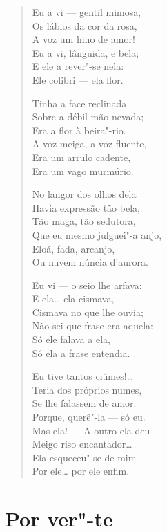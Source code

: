 \begin{verse}
Eu a vi --- gentil mimosa,\\
Os lábios da cor da rosa,\\
A voz um hino de amor!\\
Eu a vi, lânguida, e bela;\\
E ele a rever"-se nela:\\
Ele colibri --- ela flor.

Tinha a face reclinada\\
Sobre a débil mão nevada;\\
Era a flor à beira"-rio.\\
A voz meiga, a voz fluente,\\
Era um arrulo cadente,\\
Era um vago murmúrio.

No langor dos olhos dela\\
Havia expressão tão bela,\\
Tão maga, tão sedutora,\\
Que eu mesmo julguei"-a anjo,\\
Eloá, fada, arcanjo,\\
Ou nuvem núncia d'aurora.

Eu vi --- o seio lhe arfava:\\
E ela\ldots{} ela cismava,\\
Cismava no que lhe ouvia;\\
Não sei que frase era aquela:\\
Só ele falava a ela,\\
Só ela a frase entendia.

Eu tive tantos ciúmes!\ldots{}\\
Teria dos próprios numes,\\
Se lhe falassem de amor.\\
Porque, querê"-la --- só eu.\\
Mas ela! --- A outro ela deu\\
Meigo riso encantador\ldots{}\\
Ela esqueceu"-se de mim\\
Por ele\ldots{} por ele enfim.
\end{verse}

\chapter{Por ver"-te}

